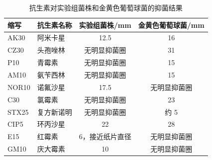 \documentclass[UTF8,a4paper,12pt,fontset=none]{ctexart}
\numberwithin{figure}{section}
\begin{document}
\begin{table}[H]
    \centering
    \caption{抗生素对实验组菌株和金黄色葡萄球菌的抑菌结果}
    \begin{tabular}{llcc}
        \toprule
        \textbf{缩写} & \textbf{抗生素名称} & \textbf{实验组菌株/mm} & \textbf{金黄色葡萄球菌/mm} \\
        \midrule
        AK30 & 阿米卡星 & 12.5 & 16 \\
        CZ30 & 头孢唑林 & 无明显抑菌圈 & 31 \\
        P10 & 青霉素 & 无明显抑菌圈 & 15 \\
        AM10 & 氨苄西林 & 无明显抑菌圈 & 15 \\
        NOR10 & 诺氟沙星 & 17.5 & 无明显抑菌圈 \\
        C30 & 氯霉素 & 无明显抑菌圈 & 23 \\
        STX25 & 复方新诺明 & 无明显抑菌圈 & 约 5 \\
        CIP5 & 环丙沙星 & 22 & 28 \\
        E15 & 红霉素 & 6，接近纸片直径 & 无明显抑菌圈 \\
        GM10 & 庆大霉素 & 10 & 无明显抑菌圈 \\
        \bottomrule
    \end{tabular}
    \label{tab:antibiotic_inhibition}
\end{table}
\end{document}
